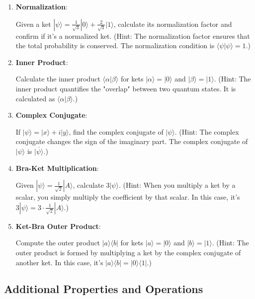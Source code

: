 \documentclass[a4paper]{article}
\begin{document}
\begin{enumerate}
    \item \textbf{Normalization}:
    
    Given a ket $|\psi\rangle = \frac{1}{\sqrt{3}}|0\rangle + \frac{2}{\sqrt{3}}|1\rangle$, calculate its normalization factor and confirm if it's a normalized ket. (Hint: The normalization factor ensures that the total probability is conserved. The normalization condition is $\langle\psi|\psi\rangle = 1$.)

    \item \textbf{Inner Product}:
    
    Calculate the inner product $\langle\alpha|\beta\rangle$ for kets $|\alpha\rangle = |0\rangle$ and $|\beta\rangle = |1\rangle$. (Hint: The inner product quantifies the "overlap" between two quantum states. It is calculated as $\langle\alpha|\beta\rangle$.)

    \item \textbf{Complex Conjugate}:
    
    If $|\psi\rangle = |x\rangle + i|y\rangle$, find the complex conjugate of $|\psi\rangle$. (Hint: The complex conjugate changes the sign of the imaginary part. The complex conjugate of $|\psi\rangle$ is $\overline{|\psi\rangle}$.)

    \item \textbf{Bra-Ket Multiplication}:
    
    Given $|\psi\rangle = \frac{1}{\sqrt{2}}|A\rangle$, calculate $3|\psi\rangle$. (Hint: When you multiply a ket by a scalar, you simply multiply the coefficient by that scalar. In this case, it's $3|\psi\rangle = 3 \cdot \frac{1}{\sqrt{2}}|A\rangle$.)

    \item \textbf{Ket-Bra Outer Product}:
    
    Compute the outer product $|a\rangle\langle b|$ for kets $|a\rangle = |0\rangle$ and $|b\rangle = |1\rangle$. (Hint: The outer product is formed by multiplying a ket by the complex conjugate of another ket. In this case, it's $|a\rangle\langle b| = |0\rangle\langle 1|$.)
\end{enumerate}

\subsection*{Additional Properties and Operations}
\end{document}
